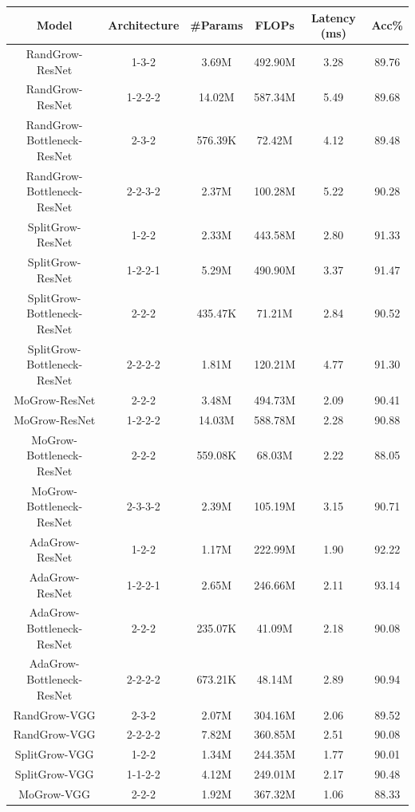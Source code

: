 \documentclass[preprint,12pt]{elsarticle}
\begin{document}
\begin{table}[ht]
\centering
\tiny
\renewcommand{\arraystretch}{1.3}
\begin{adjustbox}{center}
\begin{tabular}{c|c|c|c|c|c}
\hline
\textbf{Model} & \textbf{Architecture} & \textbf{\#Params} & \textbf{FLOPs} & \textbf{Latency (ms)} & \textbf{Acc\%} \\
\hline
RandGrow-ResNet & 1-3-2 & 3.69M & 492.90M & 3.28 & 89.76 \\
RandGrow-ResNet & 1-2-2-2 & 14.02M & 587.34M & 5.49 & 89.68 \\
RandGrow-Bottleneck-ResNet & 2-3-2 & 576.39K & 72.42M & 4.12 & 89.48 \\
RandGrow-Bottleneck-ResNet & 2-2-3-2 & 2.37M & 100.28M & 5.22 & 90.28 \\
SplitGrow-ResNet & 1-2-2 & 2.33M & 443.58M & 2.80 & 91.33 \\
SplitGrow-ResNet & 1-2-2-1 & 5.29M & 490.90M & 3.37 & 91.47 \\
SplitGrow-Bottleneck-ResNet & 2-2-2 & 435.47K & 71.21M & 2.84 & 90.52 \\
SplitGrow-Bottleneck-ResNet & 2-2-2-2 & 1.81M & 120.21M & 4.77 & 91.30 \\
MoGrow-ResNet & 2-2-2 & 3.48M & 494.73M & 2.09 & 90.41 \\
MoGrow-ResNet & 1-2-2-2 & 14.03M & 588.78M & 2.28 & 90.88 \\
MoGrow-Bottleneck-ResNet & 2-2-2 & 559.08K & 68.03M & 2.22 & 88.05 \\
MoGrow-Bottleneck-ResNet & 2-3-3-2 & 2.39M & 105.19M & 3.15 & 90.71 \\
AdaGrow-ResNet & 1-2-2 & 1.17M & 222.99M & 1.90 & 92.22 \\
AdaGrow-ResNet & 1-2-2-1 & 2.65M & 246.66M & 2.11 & 93.14 \\
AdaGrow-Bottleneck-ResNet & 2-2-2 & 235.07K & 41.09M & 2.18 & 90.08 \\
AdaGrow-Bottleneck-ResNet & 2-2-2-2 & 673.21K & 48.14M & 2.89 & 90.94 \\
RandGrow-VGG & 2-3-2 & 2.07M & 304.16M & 2.06 & 89.52 \\
RandGrow-VGG & 2-2-2-2 & 7.82M & 360.85M & 2.51 & 90.08 \\
SplitGrow-VGG & 1-2-2 & 1.34M & 244.35M & 1.77 & 90.01 \\
SplitGrow-VGG & 1-1-2-2 & 4.12M & 249.01M & 2.17 & 90.48 \\
MoGrow-VGG & 2-2-2 & 1.92M & 367.32M & 1.06 & 88.33 \\

\end{tabular}
\end{adjustbox}
\end{table}
\end{document}

